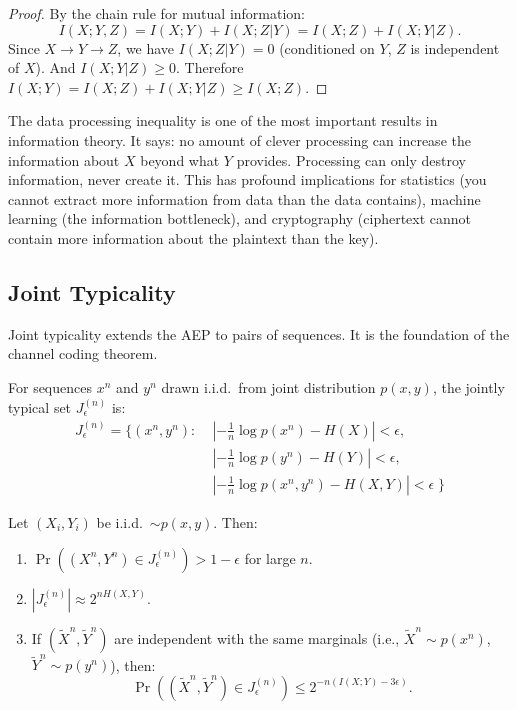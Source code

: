 \begin{proof}
By the chain rule for mutual information:
\[
I(X;Y,Z) = I(X;Y) + I(X;Z|Y) = I(X;Z) + I(X;Y|Z).
\]
Since $X \to Y \to Z$, we have $I(X;Z|Y)=0$ (conditioned on $Y$, $Z$ is independent of $X$). And $I(X;Y|Z) \ge 0$. Therefore $I(X;Y) = I(X;Z) + I(X;Y|Z) \ge I(X;Z)$.
\end{proof}

The data processing inequality is one of the most important results in information theory. It says: no amount of clever processing can increase the information about $X$ beyond what $Y$ provides. Processing can only destroy information, never create it. This has profound implications for statistics (you cannot extract more information from data than the data contains), machine learning (the information bottleneck), and cryptography (ciphertext cannot contain more information about the plaintext than the key).

\subsection{Joint Typicality}
\label{sec:information:jointtypicality}

Joint typicality extends the AEP to pairs of sequences. It is the foundation of the channel coding theorem.

\begin{definition}
For sequences $x^n$ and $y^n$ drawn i.i.d.\ from joint distribution $p(x,y)$, the jointly typical set $J_\epsilon^{(n)}$ is:
\begin{equation*}
\begin{aligned}
J_\epsilon^{(n)} = \bigl\{ (x^n,y^n) : \;&
\left|-\frac{1}{n}\log p(x^n)-H(X)\right| < \epsilon, \\
&\left|-\frac{1}{n}\log p(y^n)-H(Y)\right| < \epsilon, \\
&\left|-\frac{1}{n}\log p(x^n,y^n)-H(X,Y)\right| < \epsilon \;\bigr\}
\end{aligned}
\end{equation*}
\end{definition}

\begin{theorem}
Let $(X_i,Y_i)$ be i.i.d.\ $\sim p(x,y)$. Then:
\begin{enumerate}
\item $\Pr((X^n,Y^n) \in J_\epsilon^{(n)}) > 1 - \epsilon$ for large $n$.
\item $|J_\epsilon^{(n)}| \approx 2^{nH(X,Y)}$.
\item If $(\tilde{X}^n,\tilde{Y}^n)$ are independent with the same marginals (i.e., $\tilde{X}^n\sim p(x^n)$, $\tilde{Y}^n\sim p(y^n)$), then:
\[
\Pr((\tilde{X}^n,\tilde{Y}^n) \in J_\epsilon^{(n)}) \le 2^{-n(I(X;Y)-3\epsilon)}.
\]
\end{enumerate}
\end{theorem}

